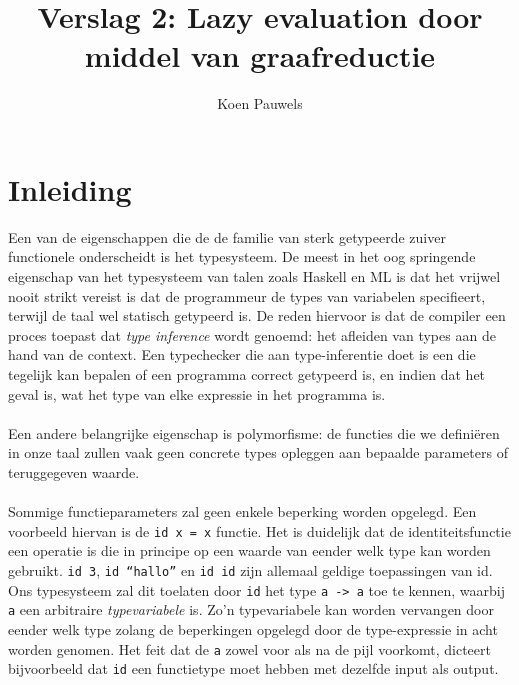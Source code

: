\documentclass[a4paper,10pt]{article}
\begin{document}
\lstset{language=Haskell}
\title{Verslag 2: Lazy evaluation door middel van graafreductie}
\author{Koen Pauwels}
\maketitle

\section{Inleiding}
Een van de eigenschappen die de de familie van sterk getypeerde zuiver functionele onderscheidt is het typesysteem.
De meest in het oog springende eigenschap van het typesysteem van talen zoals Haskell en ML is dat het vrijwel nooit strikt vereist is dat de programmeur de types van variabelen specifieert, terwijl de taal wel statisch getypeerd is.
De reden hiervoor is dat de compiler een proces toepast dat \emph{type inference} wordt genoemd: het afleiden van types aan de hand van de context.
Een typechecker die aan type-inferentie doet is een die tegelijk kan bepalen of een programma correct getypeerd is, en indien dat het geval is, wat het type van elke expressie in het programma is.
\paragraph{}
Een andere belangrijke eigenschap is polymorfisme: de functies die we defini{\"e}ren in onze taal zullen vaak geen concrete types opleggen aan bepaalde parameters of teruggegeven waarde.
\paragraph{}
Sommige functieparameters zal geen enkele beperking worden opgelegd.
Een voorbeeld hiervan is de \texttt{id x = x} functie.
Het is duidelijk dat de identiteitsfunctie een operatie is die in principe op een waarde van eender welk type kan worden gebruikt.
\texttt{id 3}, \texttt{id ``hallo''} en \texttt{id id} zijn allemaal geldige toepassingen van id.
Ons typesysteem zal dit toelaten door \texttt{id} het type \texttt{a -> a} toe te kennen, waarbij \texttt{a} een arbitraire \emph{typevariabele} is.
Zo'n typevariabele kan worden vervangen door eender welk type zolang de beperkingen opgelegd door de type-expressie in acht worden genomen.
Het feit dat de \texttt{a} zowel voor als na de pijl voorkomt, dicteert bijvoorbeeld dat \texttt{id} een functietype moet hebben met dezelfde input als output.
\end{document}
